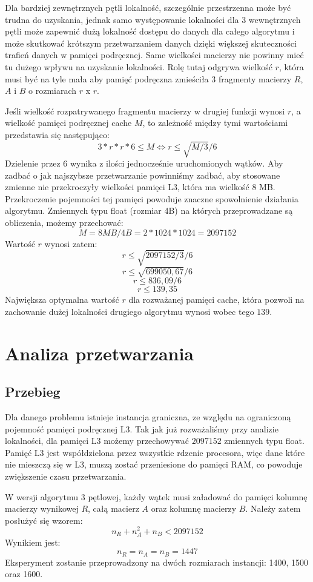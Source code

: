 \documentclass{article}
\begin{document}
Dla bardziej zewnętrznych pętli lokalność, szczególnie przestrzenna może być trudna do uzyskania, jednak samo występowanie lokalności dla 3 wewnętrznych pętli może zapewnić dużą lokalność dostępu do danych dla całego algorytmu i może skutkować krótszym przetwarzaniem danych dzięki większej skuteczności trafień danych w pamięci podręcznej. Same wielkości macierzy nie powinny mieć tu dużego wpływu na uzyskanie lokalności. Rolę tutaj odgrywa wielkość $r$, która musi być na tyle mała aby pamięć podręczna zmieściła 3 fragmenty macierzy $R$, $A$ i $B$ o rozmiarach $r$ x $r$.

Jeśli wielkość rozpatrywanego fragmentu macierzy w drugiej funkcji wynosi $r$, a wielkość pamięci podręcznej cache $M$, to zależność między tymi wartościami przedstawia się następująco:
\[ 3*r*r*6 \leq M \Longleftrightarrow r \leq \sqrt{M/3}/6\]
Dzielenie przez 6 wynika z ilości jednocześnie uruchomionych wątków. Aby zadbać o jak najszybsze przetwarzanie powinniśmy zadbać, aby stosowane zmienne nie przekroczyły wielkości pamięci L3, która ma wielkość 8 MB. Przekroczenie pojemności tej pamięci powoduje znaczne spowolnienie działania algorytmu. Zmiennych typu float (rozmiar 4B) na których przeprowadzane są obliczenia, możemy przechować: 
\[ M = 8MB/4B = 2 * 1024 * 1024 = 2097152 \]
Wartość $r$ wynosi zatem:
\[ r \leq \sqrt{2097152 / 3}/6 \]
\[ r \leq \sqrt{699050,67}/6 \]
\[ r \leq 836,09/6 \]
\[ r \leq 139,35 \]
Największa optymalna wartość $r$ dla rozważanej pamięci cache, która pozwoli na zachowanie dużej lokalności drugiego algorytmu wynosi wobec tego $139$.

\section{Analiza przetwarzania}
\subsection{Przebieg}

Dla danego problemu istnieje instancja graniczna, ze względu na ograniczoną pojemność pamięci podręcznej L3. Tak jak już rozważaliśmy przy analizie lokalności, dla pamięci L3 możemy przechowywać $2097152$ zmiennych typu float. Pamięć L3 jest współdzielona przez wszystkie rdzenie procesora, więc dane które nie mieszczą się w L3, muszą zostać przeniesione do pamięci RAM, co powoduje zwiększenie czasu przetwarzania.

W wersji algorytmu 3 pętlowej, każdy wątek musi załadować do pamięci kolumnę macierzy wynikowej $R$, całą macierz $A$ oraz kolumnę macierzy $B$.
Należy zatem posłużyć się wzorem:
\[ n_R + n_A^2 + n_B < 2097152 \]
Wynikiem jest:
\[ n_R = n_A = n_B = 1447\]
Eksperyment zostanie przeprowadzony na dwóch rozmiarach instancji: 1400, 1500 oraz 1600.
\end{document}
